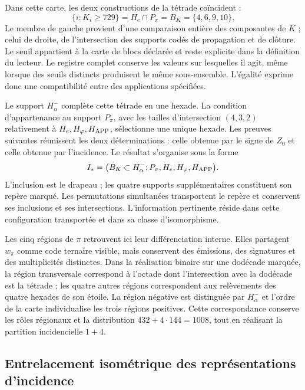 Dans cette carte, les deux constructions de la tétrade coïncident :
\begin{equation}
 \{i:K_i\geq729\}
 =H_e\cap P_\pi=B_K=\{4,6,9,10\}.
 \label{x_reciprocidad:inc-ampl-cuaterna}
\end{equation}
Le membre de gauche provient d'une comparaison entière des composantes
de $K$ ; celui de droite, de l'intersection des supports codés de
propagation et de clôture. Le seuil appartient à la carte de blocs
déclarée et reste explicite dans la définition du lecteur. Le
registre complet conserve les valeurs sur lesquelles il agit, même lorsque
des seuils distincts produisent le même sous-ensemble. L'égalité exprime
donc une compatibilité entre des applications spécifiées.

Le support $H^-_\alpha$ complète cette tétrade en une hexade. La
condition d'appartenance au support $P_\pi$, avec les tailles
d'intersection $(4,3,2)$ relativement à $H_e,H_\varphi,H_{\rm APP}$,
sélectionne une unique hexade. Les preuves suivantes réunissent les deux
déterminations : celle obtenue par le signe de $Z_0$ et celle obtenue
par l'incidence. Le résultat s'organise sous la forme
\begin{equation}
 \widetilde{\mathcal I}_*
 =\bigl(B_K\subset H^-_\alpha;
         P_\pi,H_e,H_\varphi,H_{\rm APP}\bigr).
 \label{x_reciprocidad:inc-ampl-marco}
\end{equation}
L'inclusion est le drapeau ; les quatre supports supplémentaires constituent
son repère marqué. Les permutations simultanées transportent le repère et
conservent ses inclusions et ses intersections. L'information pertinente réside
dans cette configuration transportée et dans sa classe d'isomorphisme.

Les cinq régions de $\pi$ retrouvent ici leur différenciation interne.
Elles partagent $w_\pi$ comme code ternaire visible, mais conservent des émissions,
des signatures et des multiplicités distinctes. Dans la réalisation binaire sur une
dodécade marquée, la région transversale correspond à l'octade dont
l'intersection avec la dodécade est la tétrade ; les quatre autres régions
correspondent aux relèvements des quatre hexades de son étoile. La
région négative est distinguée par $H^-_\alpha$ et l'ordre de la carte
individualise les trois régions positives. Cette correspondance conserve
les rôles régionaux et la distribution $432+4\cdot144=1008$, tout en
réalisant la partition incidencielle $1+4$.



\subsection{Entrelacement isométrique des représentations d'incidence}
\label{x_reciprocidad:exc:entrelazador}

